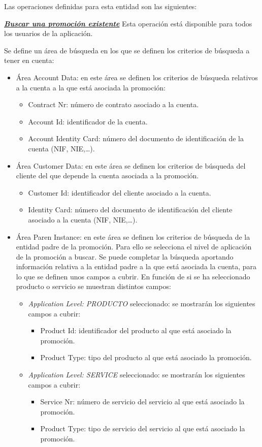 Las operaciones definidas para esta entidad son las siguientes:


\underline{\textsl{\textbf{Buscar una promoción existente}}}\newline
Esta operación está disponible para todos los usuarios de la aplicación.

Se define un área de búsqueda en los que se definen los criterios de búsqueda a tener en cuenta:

\begin{itemize}
	\item Área Account Data: en este área se definen los criterios de búsqueda relativos a la cuenta a la que está asociada la promoción:
		\begin{itemize}
			\item Contract Nr: número de contrato asociado a la cuenta.
			\item Account Id: identificador de la cuenta.
			\item Account Identity Card: número del documento de identificación de la cuenta (NIF, NIE,\dots).
		\end{itemize}
	\item Área Customer Data: en este área se definen los criterios de búsqueda del cliente del que depende la cuenta asociada a la promoción.
		\begin{itemize}
			\item Customer Id: identificador del cliente asociado a la cuenta.
			\item Identity Card: número del documento de identificación del cliente asociado a la cuenta (NIF, NIE,\dots).
		\end{itemize}
	\item Área Paren Instance: en este área se definen los criterios de búsqueda de la entidad padre de la promoción. Para ello se selecciona el nivel de aplicación de la promoción a buscar. Se puede completar la búsqueda aportando información relativa a la entidad padre a la que está asociada la cuenta, para lo que se definen unos campos a cubrir. En función de si se ha seleccionado producto o servicio se muestran distintos campos:
	\begin{itemize}
 		\item \emph{Application Level: PRODUCTO} seleccionado: se mostrarán los siguientes campos a cubrir:
			\begin{itemize}
				\item Product Id: identificador del producto al que está asociado la promoción.
				\item Product Type: tipo del producto al que está asociado la promoción.
			\end{itemize}
		\item \emph{Application Level: SERVICE} seleccionado:  se mostrarán los siguientes campos a cubrir:
		\begin{itemize}
			\item Service Nr: número de servicio del servicio al que está asociado la promoción.
			\item Product Type: tipo de servicio del servicio al que está asociado la promoción.
		\end{itemize}
		

\end{itemize}
\end{itemize}
